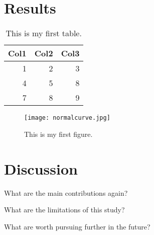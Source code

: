 \documentclass[12pt]{article}
\begin{document}
\section{Results}
\label{sec:results}

\begin{table}[ht]
  \caption{This is my first table.}
  \label{tab:rv}
\centering
\begin{tabular}{rrr}
  \hline
Col1 & Col2 & Col3 \\ 
  \hline
1 & 2 & 3 \\ 
4 & 5 & 8\\ 
7 & 8 & 9\\ 
   \hline
\end{tabular}
\end{table}



\begin{figure}
  \centering
  \texttt{[image: normalcurve.jpg]}
  \caption{This is my first figure.}
  \label{fig:graph}
\end{figure}

\section{Discussion}
\label{sec:disc}

What are the main contributions again?

What are the limitations of this study?

What are worth pursuing further in the future?

\lipsum[1-2]



\end{document}

